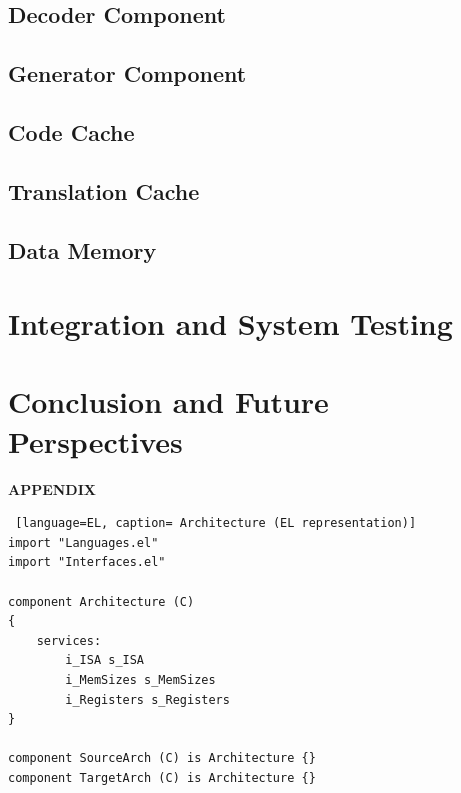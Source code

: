 \documentclass[12pt]{article}
\begin{document}
\subsection{Decoder Component}

\subsection{Generator Component}

\subsection{Code Cache}

\subsection{Translation Cache}

\subsection{Data Memory}

\newpage
\section{Integration and System Testing}


\newpage
\section{Conclusion and Future Perspectives}


\newpage



\newpage
\begin{appendices}
\huge \textbf{APPENDIX}
\end{appendices}


\begin{lstlisting} [language=EL, caption= Architecture (EL representation)]
import "Languages.el"
import "Interfaces.el"

component Architecture (C)
{
	services:
		i_ISA s_ISA
		i_MemSizes s_MemSizes
		i_Registers s_Registers
}

component SourceArch (C) is Architecture {}
component TargetArch (C) is Architecture {}
\end{lstlisting}
\end{document}
